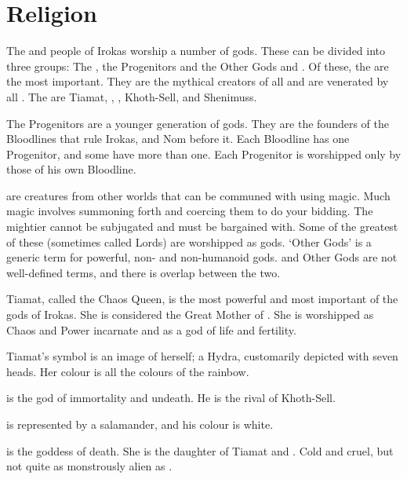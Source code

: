 \section{Religion}
The \dragons{} and people of Irokas worship a number of gods. These can be divided into three groups: The \Dominators{}, the Progenitors and the Other Gods and \daemons{}. Of these, the \Dominators{} are the most important. They are the mythical creators of all \Dragonkind{} and are venerated by all \dragons{}. The \Dominators{} are Tiamat, \Iurzmacul, \Typhon{}, Khoth-Sell, \ApepN{} and Shenimuss. 

The Progenitors are a younger generation of gods. They are the founders of the Bloodlines that rule Irokas, and Nom before it. Each Bloodline has one Progenitor, and some have more than one. Each Progenitor is worshipped only by those of his own Bloodline. 

\Daemons{} are creatures from other worlds that can be communed with using magic. Much \draconic{} magic involves summoning forth \daemons{} and coercing them to do your bidding. The mightier \daemons{} cannot be subjugated and must be bargained with. Some of the greatest of these (sometimes called \Daemon{} Lords) are worshipped as gods. `Other Gods' is a generic term for powerful, non-\draconic{} and non-humanoid gods. \Daemons{} and Other Gods are not well-defined terms, and there is overlap between the two. 

\subsectionthe{\Dominators{}}
Tiamat, called the Chaos Queen, is the most powerful and most important of the gods of Irokas. She is considered the Great Mother of \Dragonkind. She is worshipped as Chaos and Power incarnate and as a god of life and fertility. 

Tiamat's symbol is an image of herself; a Hydra, customarily depicted with seven heads. Her colour is all the colours of the rainbow. 

\subsubsectionn{\ApepN{}}
 is the god of immortality and undeath. He is the rival of Khoth-Sell. 

\ApepN{} is represented by a salamander, and his colour is white. 

 is the goddess of death. She is the daughter of Tiamat and \Iurzmacul{}. Cold and cruel, but not quite as monstrously alien as \NerrhanKoss{}. 


